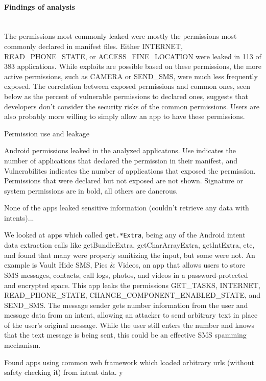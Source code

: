\documentclass[12pt,a4paper]{article}
\begin{document}
\paragraph{Findings of analysis} ~\\

The permissions most commonly leaked were mostly the permissions most commonly
declared in manifest files. Either INTERNET, READ\_PHONE\_STATE, or
ACCESS\_FINE\_LOCATION were leaked in 113 of 383 applications. While exploits
are possible based on these permissions, the more active permissions, such as
CAMERA or SEND\_SMS, were much less frequently exposed. The correlation between
exposed permissions and common ones, seen below as the percent of vulnerable
permissions to declared ones, suggests that developers don't consider the
security risks of the common permissions. Users are also probably more willing
to simply allow an app to have these permissions.
\begin{table}
\caption{Permission use and leakage}

\caption*{Android permissions leaked in the analyzed applicatons. Use indicates
  the number of applications that declared the permission in their
  manifest, and Vulnerabilites indicates the number of applications that
  exposed the permission.  Permissions that were declared but not exposed
  are not shown. Signature or system permissions are in bold, all others
  are danerous.}
\end{table}
None of the apps leaked sensitive information (couldn't retrieve any data with
intents)...

We looked at apps which called \texttt{get.*Extra}, being any of the Android
intent data extraction calls like getBundleExtra, getCharArrayExtra,
getIntExtra, etc, and found that many were properly sanitizing the input, but
some were not. An example is Vault Hide SMS, Pics \& Videos, an app that allows
users to store SMS messages, contacts, call logs, photos, and videos in a
password-protected and encrypted space. This app leaks the permissions
GET\_TASKS, INTERNET, READ\_PHONE\_STATE, CHANGE\_COMPONENT\_ENABLED\_STATE, and
SEND\_SMS. The message sender gets number information from the user and message
data from an intent, allowing an attacker to send arbitrary text in place of the
user's original message. While the user still enters the number and knows that
the text message is being sent, this could be an effective SMS spamming
mechanism.

Found apps using common web framework which loaded arbitrary urls (without
safety checking it) from intent data.  y
\end{document}
